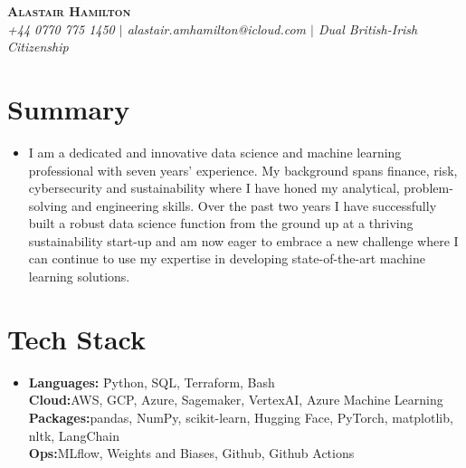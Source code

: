 \documentclass[letterpaper,11pt]{article}
\begin{document}
\vspace{-5pt}

\begin{center}
    \textbf{\Huge \scshape Alastair Hamilton} \\
    \textit{\small +44 0770 775 1450 $|$ alastair.amhamilton@icloud.com $|$ Dual British-Irish Citizenship}
    \vspace{8pt} 
\end{center}

\section{Summary}
\begin{itemize}[leftmargin=0.2in, label={}]
    \item 
        \begin{minipage}[t]{1.0\linewidth}
            I am a dedicated and innovative data science and machine learning 
            professional with 
            seven years' experience. My background spans finance, risk, 
            cybersecurity and sustainability  where I have honed my analytical, problem-solving and engineering
            skills.  Over the past two years I have successfully built a robust data science 
            function from the ground up at a thriving sustainability start-up 
            and am now eager to embrace a new 
            challenge where I can continue to use my expertise in developing 
            state-of-the-art machine learning solutions. 
        \end{minipage}
\end{itemize}

\section{Tech Stack}
\begin{itemize}[leftmargin=0.2in, label={}]
    \item 
        \begin{minipage}[t]{1.0\linewidth}
            \begin{tabbing}
            \textbf{Languages:}  \=Python, SQL, Terraform, Bash \\
            \textbf{Cloud:}\>AWS, GCP, Azure, Sagemaker, VertexAI, 
            Azure Machine Learning \\
            \textbf{Packages:}\>pandas, NumPy, scikit-learn, Hugging
            Face, PyTorch, matplotlib, nltk, LangChain \\
            \textbf{Ops:}\>MLflow, Weights and Biases, Github, 
            Github Actions
            \end{tabbing} 
        \end{minipage}
\end{itemize}
\end{document}
